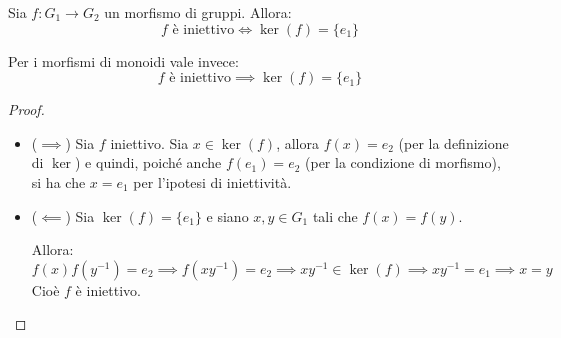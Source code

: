 \documentclass[../main.tex]{subfiles}
\begin{document}
\begin{theorem}
    \label{th:1.38}
    Sia $f : G_1 \rightarrow G_2$ un morfismo di gruppi. Allora:
    \[
        \text{$f$ è iniettivo} \iff \ker(f) = \{e_1\}
    \]
    \begin{note}
        Per i morfismi di monoidi vale invece:
        \[
            \text{$f$ è iniettivo} \implies \ker(f) = \{e_1\}
        \]
    \end{note}
\end{theorem}

\begin{proof}\
    \begin{itemize}
        \item ($\implies$) Sia $f$ iniettivo. Sia $x \in \ker(f)$, allora $f(x) = e_2$ (per la definizione di $\ker$) e quindi, poiché anche $f(e_1) = e_2$ (per la condizione di morfismo), si ha che $x = e_1$ per l'ipotesi di iniettività.

        \item ($\impliedby$) Sia $\ker(f) = \{e_1\}$ e siano $x,y \in G_1$ tali che $f(x) = f(y)$.

              Allora:
              \[
                  f(x)f(y^{-1}) = e_2 \implies  f(xy^{-1}) = e_2 \implies  xy^{-1} \in \ker(f) \implies xy^{-1} = e_1 \implies x=y
              \]
              Cioè $f$ è iniettivo.
    \end{itemize}
\end{proof}
\end{document}
